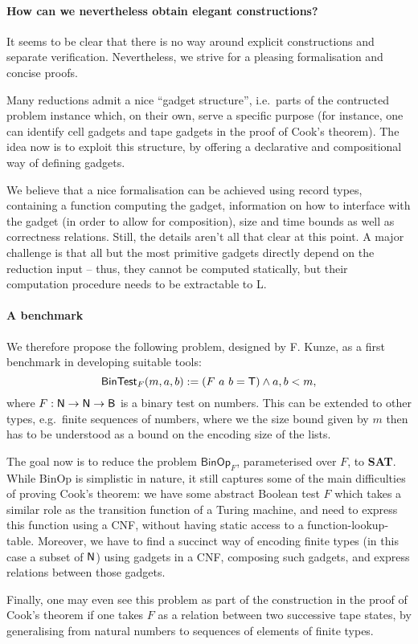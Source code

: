 \documentclass[a4paper,UKenglish,cleveref, autoref]{lipics-v2019}
\begin{document}
\paragraph*{How can we nevertheless obtain elegant constructions?}
It seems to be clear that there is no way around explicit constructions and separate verification. Nevertheless, we strive for a pleasing formalisation and concise proofs. 

Many reductions admit a nice ``gadget structure'', i.e.\ parts of the contructed problem instance which, on their own, serve a specific purpose (for instance, one can identify cell gadgets and tape gadgets in the proof of Cook's theorem). 
The idea now is to exploit this structure, by offering a declarative and compositional way of defining gadgets. 

We believe that a nice formalisation can be achieved using record types, containing a function computing the gadget, information on how to interface with the gadget (in order to allow for composition), size and time bounds as well as correctness relations.
Still, the details aren't all that clear at this point. A major challenge is that all but the most primitive gadgets directly depend on the reduction input -- thus, they cannot be computed statically, but their computation procedure needs to be extractable to L. 

\paragraph*{A benchmark}
We therefore propose the following problem, designed by F. Kunze, as a first benchmark in developing suitable tools:
\[\textsf{BinTest}_F (m, a, b) := (F~a~b = \mathsf{T}) \land a, b < m,  \] 
where $F : \mathsf{N} \rightarrow \mathsf{N} \rightarrow \textsf{B}$ is a binary test on numbers. This can be extended to other types, e.g.\ finite sequences of numbers, where we the size bound given by $m$ then has to be understood as a bound on the encoding size of the lists. 

The goal now is to reduce the problem $\textsf{BinOp}_F$, parameterised over $F$, to \textbf{SAT}. While \textsf{BinOp} is simplistic in nature, it still captures some of the main difficulties of proving Cook's theorem: we have some abstract Boolean test $F$ which takes a similar role as the transition function of a Turing machine, and need to express this function using a CNF, without having static access to a function-lookup-table. Moreover, we have to find a succinct way of encoding finite types (in this case a subset of $\mathsf{N}$) using gadgets in a CNF, composing such gadgets, and express relations between those gadgets. 

Finally, one may even see this problem as part of the construction in the proof of Cook's theorem if one takes $F$ as a relation between two successive tape states, by generalising from natural numbers to sequences of elements of finite types.




{}
\end{document}
